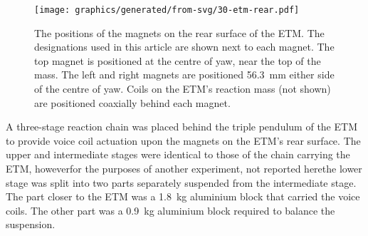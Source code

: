 \begin{figure}
  \centering
  \texttt{[image: graphics/generated/from-svg/30-etm-rear.pdf]}
  \caption[Positions of the magnets on the rear surface of the end test mass used in the waveguide experiment]{\label{fig:etm-rear}The positions of the magnets on the rear surface of the \gls{ETM}. The designations used in this article are shown next to each magnet. The top magnet is positioned at the centre of yaw, near the top of the mass. The left and right magnets are positioned \SI{56.3}{\milli\meter} either side of the centre of yaw. Coils on the \gls{ETM}'s reaction mass (not shown) are positioned coaxially behind each magnet.}
\end{figure}

A three-stage reaction chain was placed behind the triple pendulum of the \gls{ETM} to provide voice coil actuation upon the magnets on the \gls{ETM}'s rear surface. The upper and intermediate stages were identical to those of the chain carrying the \gls{ETM}, however\textemdash for the purposes of another experiment, not reported here\textemdash the lower stage was split into two parts separately suspended from the intermediate stage. The part closer to the \gls{ETM} was a \SI{1.8}{\kilo\gram} aluminium block that carried the voice coils. The other part was a \SI{0.9}{\kilo\gram} aluminium block required to balance the suspension.

